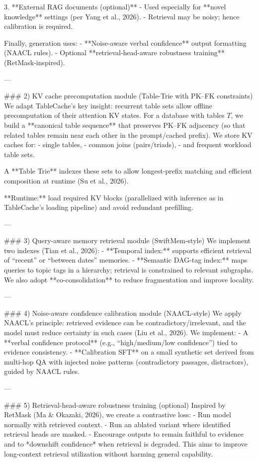 3. **External RAG documents (optional)**  
   - Used especially for **novel knowledge** settings (per Yang et al., 2026).  
   - Retrieval may be noisy; hence calibration is required.

Finally, generation uses:
- **Noise-aware verbal confidence** output formatting (NAACL rules).  
- Optional **retrieval-head-aware robustness training** (RetMask-inspired).

---

### 2) KV cache precomputation module (Table-Trie with PK–FK constraints)  
We adapt TableCache’s key insight: recurrent table sets allow offline precomputation of their attention KV states. For a database with tables \(T\), we build a **canonical table sequence** that preserves PK–FK adjacency (so that related tables remain near each other in the prompt/cached prefix). We store KV caches for:  
- single tables,  
- common joins (pairs/triads),  
- and frequent workload table sets.

A **Table Trie** indexes these sets to allow longest-prefix matching and efficient composition at runtime (Su et al., 2026).

**Runtime:** load required KV blocks (parallelized with inference as in TableCache’s loading pipeline) and avoid redundant prefilling.

---

### 3) Query-aware memory retrieval module (SwiftMem-style)  
We implement two indexes (Tian et al., 2026):
- **Temporal index:** supports efficient retrieval of “recent” or “between dates” memories.  
- **Semantic DAG-tag index:** maps queries to topic tags in a hierarchy; retrieval is constrained to relevant subgraphs.  
We also adopt **co-consolidation** to reduce fragmentation and improve locality.

---

### 4) Noise-aware confidence calibration module (NAACL-style)  
We apply NAACL’s principle: retrieved evidence can be contradictory/irrelevant, and the model must reduce certainty in such cases (Liu et al., 2026). We implement:
- A **verbal confidence protocol** (e.g., “high/medium/low confidence”) tied to evidence consistency.  
- **Calibration SFT** on a small synthetic set derived from multi-hop QA with injected noise patterns (contradictory passages, distractors), guided by NAACL rules.

---

### 5) Retrieval-head-aware robustness training (optional)  
Inspired by RetMask (Ma & Okazaki, 2026), we create a contrastive loss:
- Run model normally with retrieved context.  
- Run an ablated variant where identified retrieval heads are masked.  
- Encourage outputs to remain faithful to evidence and to *downshift confidence* when retrieval is degraded.  
This aims to improve long-context retrieval utilization without harming general capability.

